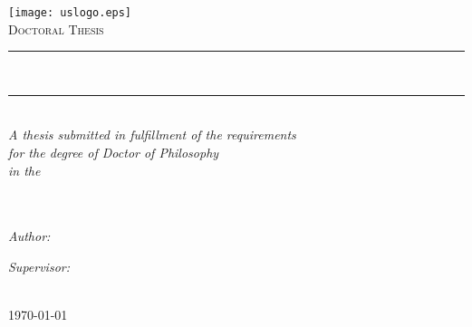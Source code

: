 \begin{titlepage}
	\begin{center}

		\texttt{[image: uslogo.eps]} \\ \medskip
		\vspace*{.05\textheight}
		\textsc{\Large Doctoral Thesis}\\%

		\rule{.9\linewidth}{.6pt}\\[0.4cm]
		{\huge \myTitle \par}\vspace{0.4cm} %
		\rule{.9\linewidth}{.6pt}\\[1cm] 

		\large \textit{A thesis submitted in fulfillment of the requirements\\ for the degree of Doctor of Philosophy}\\[0.5cm] %
		\textit{in the}\\[0.5cm]
		\myDepartment\\ \myFaculty\\[1cm]
	
		\begin{minipage}{.45\linewidth}
			\begin{flushleft} %
			\emph{Author:}\\
			\href{https://uk.linkedin.com/in/fabriziomiano}{\myName} %
			\end{flushleft}
		\end{minipage}
		\hfill
		\begin{minipage}{.45\linewidth}
			\begin{flushright} %
			\emph{Supervisor:} \\
			\href{http://www.sussex.ac.uk/profiles/168614}{\mySupervisor}%
			\end{flushright}
		\end{minipage}\\ [0.5cm]

		{\large \today}\\%
		 
		\vfill
	\end{center}
\end{titlepage}